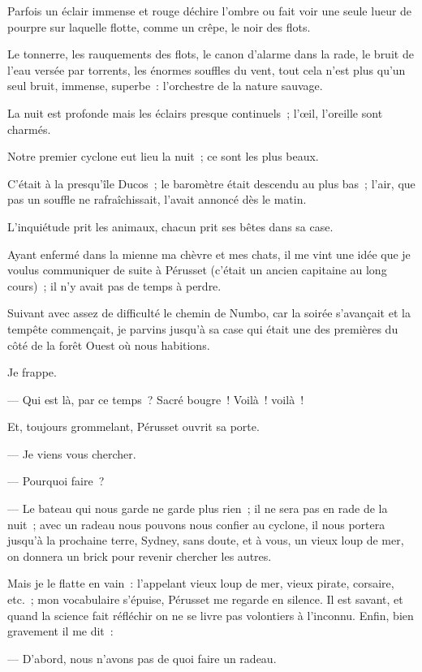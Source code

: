 \documentclass[french,twoside]{book} %
\begin{document}
Parfois un éclair immense et rouge déchire l’ombre ou fait voir une seule lueur de pourpre sur laquelle flotte, comme un crêpe, le noir des flots.\par
Le tonnerre, les rauquements des flots, le canon d’alarme dans la rade, le bruit de l’eau versée par torrents, les énormes souffles du vent, tout cela n’est plus qu’un seul bruit, immense, superbe : l’orchestre de la nature sauvage.\par
La nuit est profonde mais les éclairs presque continuels ; l’œil, l’oreille sont charmés.\par
Notre premier cyclone eut lieu la nuit ; ce sont les plus beaux.\par
C’était à la presqu’île Ducos ; le baromètre était descendu au plus bas ; l’air, que pas un souffle ne rafraîchissait, l’avait annoncé dès le matin.\par
L’inquiétude prit les animaux, chacun prit ses bêtes dans sa case.\par
Ayant enfermé dans la mienne ma chèvre et mes chats, il me vint une idée que je voulus communiquer de suite à Pérusset (c’était un ancien capitaine au long cours) ; il n’y avait pas de temps à perdre.\par
Suivant avec assez de difficulté le chemin de  Numbo, car la soirée s’avançait et la tempête commençait, je parvins jusqu’à sa case qui était une des premières du côté de la forêt Ouest où nous habitions.\par
Je frappe.\par
— Qui est là, par ce temps ? Sacré bougre ! Voilà ! voilà !\par
Et, toujours grommelant, Pérusset ouvrit sa porte.\par
— Je viens vous chercher.\par
— Pourquoi faire ?\par
— Le bateau qui nous garde ne garde plus rien ; il ne sera pas en rade de la nuit ; avec un radeau nous pouvons nous confier au cyclone, il nous portera jusqu’à la prochaine terre, Sydney, sans doute, et à vous, un vieux loup de mer, on donnera un brick pour revenir chercher les autres.\par
Mais je le flatte en vain : l’appelant vieux loup de mer, vieux pirate, corsaire, etc. ; mon vocabulaire s’épuise, Pérusset me regarde en silence. Il est savant, et quand la science fait réfléchir on ne se livre pas volontiers à l’inconnu. Enfin, bien gravement il me dit :\par
— D’abord, nous n’avons pas de quoi faire un radeau.\par
\end{document}
